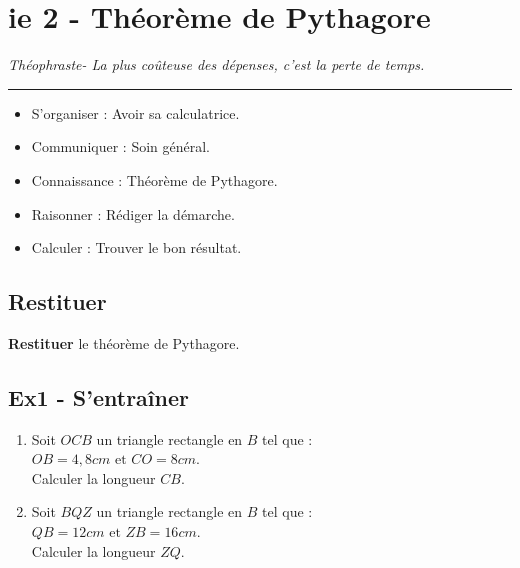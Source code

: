 \documentclass[12pt]{article}
\newcommand{\horrule}[1]{\rule{\linewidth}{#1}} %
\begin{document}

\newtheorem{Definition}{Définition}
\newtheorem{Theorem}{Théorème}
\newtheorem{Proposition}{Propriété}

\renewcommand{\labelitemi}{$\bullet$}
\renewcommand{\labelitemii}{$\circ$}

\setlength{\columnseprule}{1pt}

\section*{ie 2 - Théorème de Pythagore}
\begin{center}
  \textit{Théophraste- La plus coûteuse des dépenses, c’est la perte de temps.}
\end{center}
\horrule{2px}

\begin{multicols}{2}
  \begin{itemize}
  \item S'organiser : Avoir sa calculatrice.
  \item Communiquer : Soin général.
  \item Connaissance : Théorème de Pythagore.
  \item Raisonner : Rédiger la démarche.
  \item Calculer : Trouver le bon résultat.
  \end{itemize}
\end{multicols}


\subsection*{Restituer}

\textbf{Restituer} le théorème de Pythagore.

\subsection*{Ex1 - S'entraîner}


\begin{multicols}{2}
  \begin{enumerate}
  \item[1.] Soit $OCB$ un triangle rectangle en $B$ tel que :\\
    $OB=4,8cm \text{ et }CO=8cm$.\\
    Calculer la longueur $CB$.
    \columnbreak
  \item[2.] Soit $BQZ$ un triangle rectangle en $B$ tel que : \\
    $QB=12cm \text{ et } ZB=16cm$.\\
    Calculer la longueur $ZQ$.
  \end{enumerate}
\end{multicols}
\end{document}
